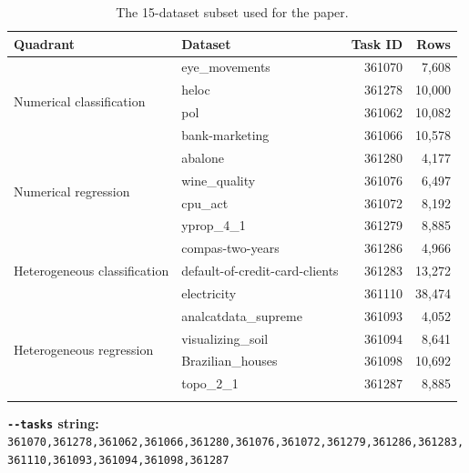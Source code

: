 \documentclass[11pt]{article}
\newcommand{\code}[1]{\texttt{#1}}
\begin{document}
\begin{longtable}{@{}p{4.6cm} l r r@{}}
\toprule
\textbf{Quadrant} & \textbf{Dataset} & \textbf{Task ID} & \textbf{Rows} \\
\midrule
\endhead
\multirow{4}{*}{Numerical classification}
 & eye\_movements & 361070 & 7{,}608 \\
 & heloc & 361278 & 10{,}000 \\
 & pol & 361062 & 10{,}082 \\
 & bank-marketing & 361066 & 10{,}578 \\
\midrule
\multirow{4}{*}{Numerical regression}
 & abalone & 361280 & 4{,}177 \\
 & wine\_quality & 361076 & 6{,}497 \\
 & cpu\_act & 361072 & 8{,}192 \\
 & yprop\_4\_1 & 361279 & 8{,}885 \\
\midrule
\multirow{3}{*}{Heterogeneous classification}
 & compas-two-years & 361286 & 4{,}966 \\
 & default-of-credit-card-clients & 361283 & 13{,}272 \\
 & electricity & 361110 & 38{,}474 \\
\midrule
\multirow{4}{*}{Heterogeneous regression}
 & analcatdata\_supreme & 361093 & 4{,}052 \\
 & visualizing\_soil & 361094 & 8{,}641 \\
 & Brazilian\_houses & 361098 & 10{,}692 \\
 & topo\_2\_1 & 361287 & 8{,}885 \\
\bottomrule
\caption{The 15-dataset subset used for the paper.}
\label{tab:datasets}
\end{longtable}

\noindent\textbf{\code{-{}-tasks} string:}\\
\code{361070,361278,361062,361066,361280,361076,361072,361279,361286,361283,361110,361093,361094,361098,361287}

\end{document}
